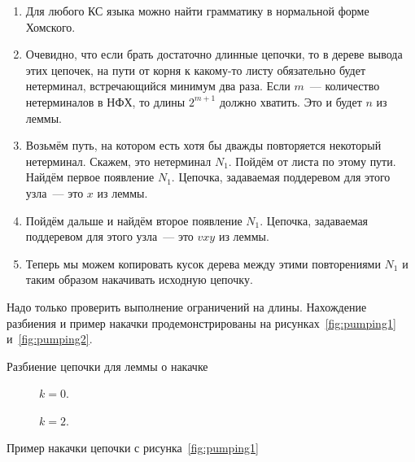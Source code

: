 \begin{proofSketch}

    \begin{enumerate}
        \item Для любого КС языка можно найти грамматику в нормальной форме Хомского.
        \item Очевидно, что если брать достаточно длинные цепочки, то в дереве вывода этих цепочек, на пути от корня к какому-то листу обязательно будет нетерминал, встречающийся минимум два раза. Если $m$~--- количество нетерминалов в НФХ, то длины $2^{m+1}$ должно хватить. Это и будет $n$ из леммы.
        \item Возьмём путь, на котором есть хотя бы дважды повторяется некоторый нетерминал. Скажем, это нетерминал  $N_1$. Пойдём от листа по этому пути. Найдём первое появление $N_1$. Цепочка, задаваемая поддеревом для этого узла~--- это $x$ из леммы.
        \item Пойдём дальше и найдём второе появление $N_1$. Цепочка, задаваемая поддеревом для этого узла~--- это $vxy$ из леммы.
        \item Теперь мы можем копировать кусок дерева между этими повторениями $N_1$ и таким образом накачивать исходную цепочку.
    \end{enumerate}
    Надо только проверить выполнение ограничений на длины.
    Нахождение разбиения и пример накачки продемонстрированы на рисунках~\ref{fig:pumping1} и~\ref{fig:pumping2}.
\end{proofSketch}

\begin{marginfigure}
    \centering
    
    \caption{Разбиение цепочки для леммы о накачке}
    \label{fig:pumping1}
\end{marginfigure}

\begin{marginfigure}
    \begin{center}
    \begin{subfigure}{\marginparwidth}
        \centering
        
        \caption{$k = 0$.}
    \end{subfigure}
    
    \begin{subfigure}{\linewidth}
        \centering
        
        \caption{$k = 2$.}
    \end{subfigure}
\end{center}
    \caption{Пример накачки цепочки с рисунка~\ref{fig:pumping1}}
    \label{fig:pumping2}
\end{marginfigure}

